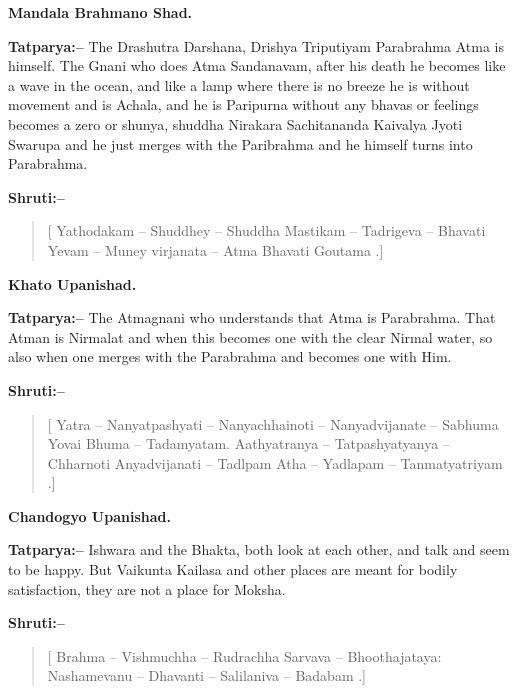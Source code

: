 \begin{flushright}
\textbf{Mandala Brahmano Shad.}
\end{flushright}

\textbf{Tatparya:–} The Drashutra Darshana, Drishya Triputiyam Parabrahma Atma is himself. The Gnani who does Atma Sandanavam, after his death he becomes like a wave in the ocean, and like a lamp where there is no breeze he is without movement and is Achala, and he is Paripurna without any bhavas or feelings becomes a zero or shunya, shuddha Nirakara Sachitananda Kaivalya Jyoti Swarupa and he just merges with the Paribrahma and he himself turns into Parabrahma.

\textbf{Shruti:–}

\begin{verse}
[ Yathodakam – Shuddhey – Shuddha Mastikam – Tadrigeva – Bhavati  Yevam – Muney virjanata – Atma Bhavati Goutama .]
\end{verse}

\begin{flushright}
\textbf{Khato Upanishad.}
\end{flushright}

\textbf{Tatparya:–} The Atmagnani who understands that Atma is Parabrahma. That Atman is Nirmalat and when this becomes one with the clear Nirmal water, so also when one merges with the Parabrahma and becomes one with Him.

\textbf{Shruti:–}

\begin{verse}
[ Yatra – Nanyatpashyati – Nanyachhainoti – Nanyadvijanate – Sabhuma  Yovai Bhuma – Tadamyatam. Aathyatranya – Tatpashyatyanya – Chharnoti Anyadvijanati – Tadlpam  Atha – Yadlapam – Tanmatyatriyam .]
\end{verse}

\begin{flushright}
\textbf{Chandogyo Upanishad.}
\end{flushright}

\textbf{Tatparya:–} Ishwara and the Bhakta, both look at each other, and talk and seem to be happy. But Vaikunta Kailasa and other places are meant for bodily satisfaction, they are not a place for Moksha.

\textbf{Shruti:–}

\begin{verse}
[ Brahma – Vishmuchha – Rudrachha Sarvava – Bhoothajataya:  Nashamevanu – Dhavanti – Salilaniva – Badabam .]
\end{verse}

